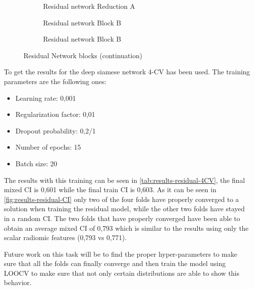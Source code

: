 \begin{figure}\ContinuedFloat
  \begin{subfigure}[b]{.49\textwidth}
    \centering
    \scalebox{.9}{}
    \caption{Residual network Reduction A \label{fig:residual-block-reduce-a}}
  \end{subfigure}
  \begin{subfigure}[b]{.49\textwidth}
    \centering
    \scalebox{.9}{}
    \caption{Residual network Block B \label{fig:residual-block-b}}
  \end{subfigure}

  \begin{subfigure}[b]{\textwidth}
    \centering
    \scalebox{.9}{}
    \caption{Residual network Block B \label{fig:residual-block-reduce-b}}
  \end{subfigure}
  \caption{Residual Network blocks (continuation)}
\end{figure}


To get the results for the deep siamese network 4-\gls{CV} has been used. The training
parameters are the following ones:
\begin{itemize}
  \item Learning rate: 0,001
  \item Regularization factor: 0,01
  \item Dropout probability: 0,2/1
  \item Number of epochs: 15
  \item Batch size: 20
\end{itemize}

The results with this training can be seen in \autoref{tab:results-residual-4CV}, the final
mixed \gls{CI} is 0,601 while the final train \gls{CI} is 0,603.
As it can be seen in \autoref{fig:results-residual-CI} only two of the four folds have 
properly converged to a solution when training the residual model, while the other two folds
have stayed in a random \gls{CI}. The two folds that have properly converged have been able
to obtain an average mixed \gls{CI} of 0,793 which is similar to the results using only
the scalar radiomic features (0,793 vs 0,771).

Future work on this task will be to find the proper hyper-parameters to make sure that all
the folds can finally converge and then train the model using \gls{LOOCV} to make sure
that not only certain distributions are able to show this behavior.

